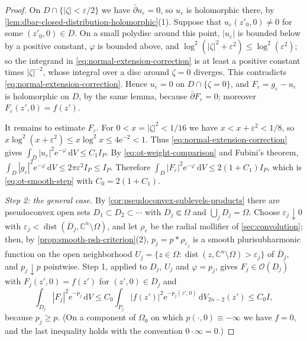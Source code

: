 \begin{proof}
On $D\cap\{|\zeta|<\varepsilon/2\}$ we have $\bar\partial u_\varepsilon=0$, so $u_\varepsilon$ is holomorphic there, by \cref{lem:dbar-closed-distribution-holomorphic}(1). Suppose that $u_\varepsilon(z'_0,0)\ne0$ for some $(z'_0,0)\in D$. On a small polydisc around this point, $|u_\varepsilon|$ is bounded below by a positive constant, $\varphi$ is bounded above, and $\log^2(|\zeta|^2+\varepsilon^2)\le\log^2(\varepsilon^2)$; so the integrand in \eqref{eq:normal-extension-correction} is at least a positive constant times $|\zeta|^{-2}$, whose integral over a disc around $\zeta=0$ diverges. This contradicts \eqref{eq:normal-extension-correction}. Hence $u_\varepsilon=0$ on $D\cap\{\zeta=0\}$, and $F_\varepsilon=g_\varepsilon-u_\varepsilon$ is holomorphic on $D$, by the same lemma, because $\bar\partial F_\varepsilon=0$; moreover $F_\varepsilon(z',0)=f(z')$.

It remains to estimate $F_\varepsilon$. For $0<x=|\zeta|^2<1/16$ we have $x<x+\varepsilon^2<1/8$, so $x\log^2(x+\varepsilon^2)\le x\log^2x\le4\mathrm e^{-2}<1$. Thus \eqref{eq:normal-extension-correction} gives $\int_D|u_\varepsilon|^2\mathrm e^{-\varphi}\,\mathrm dV\le C_1I_P$. By \eqref{eq:ot-weight-comparison} and Fubini's theorem, $\int_D|g_\varepsilon|^2\mathrm e^{-\varphi}\,\mathrm dV\le2\pi\varepsilon^2I_P\le I_P$. Therefore $\int_D|F_\varepsilon|^2\mathrm e^{-\varphi}\,\mathrm dV\le2(1+C_1)I_P$, which is \eqref{eq:ot-smooth-step} with $C_0=2(1+C_1)$.

\emph{Step 2: the general case.} By \cref{cor:pseudoconvex-sublevels-products} there are pseudoconvex open sets $D_1\subset D_2\subset\cdots$ with $D_j\Subset\Omega$ and $\bigcup_jD_j=\Omega$. Choose $\varepsilon_j\downarrow0$ with $\varepsilon_j<\operatorname{dist}(\overline D_j,\mathbb C^n\setminus\Omega)$, and let $\rho_\varepsilon$ be the radial mollifier of \cref{sec:convolution}; then, by \cref{prop:smooth-psh-criterion}(2), $p_j=p*\rho_{\varepsilon_j}$ is a smooth plurisubharmonic function on the open neighborhood $U_j=\{z\in\Omega:\operatorname{dist}(z,\mathbb C^n\setminus\Omega)>\varepsilon_j\}$ of $\overline D_j$, and $p_j\downarrow p$ pointwise. Step 1, applied to $D_j$, $U_j$ and $\varphi=p_j$, gives $F_j\in\mathcal O(D_j)$ with $F_j(z',0)=f(z')$ for $(z',0)\in D_j$ and
\[
 \int_{D_j}|F_j|^2\mathrm e^{-p_j}\,\mathrm dV\le C_0\int_{P_j}|f(z')|^2\mathrm e^{-p_j(z',0)}\,\mathrm dV_{2n-2}(z')\le C_0I,
\]
because $p_j\ge p$. (On a component of $\Omega_0$ on which $p(\cdot,0)\equiv-\infty$ we have $f=0$, and the last inequality holds with the convention $0\cdot\infty=0$.)


\end{proof}
